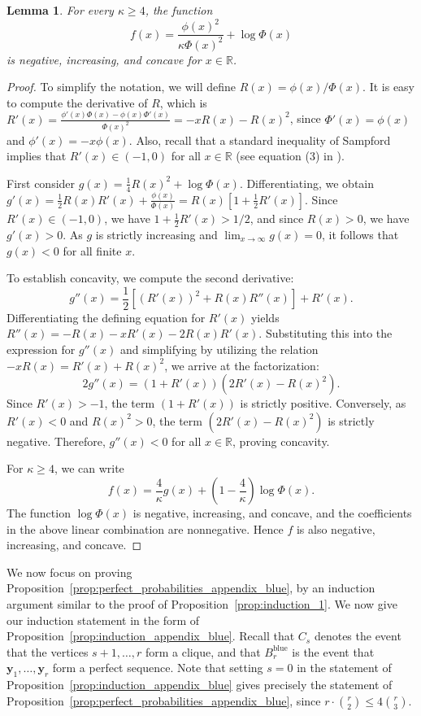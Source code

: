 \documentclass[11pt]{amsart}
\newtheorem{lemma}[theorem]{\bf Lemma}
\theoremstyle{definition}
\def\bR{\mathbb{R}}
\def\by{\boldsymbol{y}}
\DeclareMathOperator{\blue}{blue}
\begin{document}
\begin{lemma}\label{lemma:function_analysis}
For every $\kappa\geq 4$, the function
{\smaller[0.3]
\[
f(x)=\frac{\phi(x)^2}{\kappa\Phi(x)^2}+\log\Phi(x)
\]
}
is negative, increasing, and concave for $x\in \bR$.
\end{lemma}
\begin{proof}
To simplify the notation, we will define $R(x) = \phi(x)/\Phi(x)$. It is easy to compute the derivative of $R$, which is $R'(x) = \frac{\phi'(x)\Phi(x)-\phi(x)\Phi'(x)}{\Phi(x)^2}= -x R(x) - R(x)^2$, since $\Phi'(x)=\phi(x)$ and $\phi'(x)=-x\phi(x)$. Also, recall that a standard inequality of Sampford implies that $R'(x)\in (-1, 0)$ for all $x\in \bR$ (see equation (3) in \cite{Sampford}). 

First consider $g(x)=\frac{1}{4}R(x)^2+\log \Phi(x)$. Differentiating, we obtain $g'(x) = \frac{1}{2}R(x)R'(x) + \frac{\phi(x)}{\Phi(x)} = R(x)\left[1 + \frac{1}{2}R'(x)\right]$. Since $R'(x)\in (-1, 0)$, we have $1 + \frac{1}{2}R'(x) > 1/2$, and since $R(x) > 0$, we have $g'(x) > 0$. 
As $g$ is strictly increasing and $\lim_{x \to \infty} g(x) = 0$, it follows that $g(x) < 0$ for all finite $x$.

To establish concavity, we compute the second derivative:
{\smaller[0.3]
\[
g''(x) = \frac{1}{2} \left[ (R'(x))^2 + R(x)R''(x) \right] + R'(x).
\]
}
Differentiating the defining equation for $R'(x)$ yields $R''(x) = -R(x) - x R'(x) - 2R(x)R'(x)$. Substituting this into the expression for $g''(x)$ and simplifying by utilizing the relation $-x R(x) = R'(x) + R(x)^2$, we arrive at the factorization:
{\smaller[0.3]
\[
2g''(x) = (1 + R'(x))(2R'(x) - R(x)^2).
\]
}
Since $R'(x) > -1$, the term $(1+R'(x))$ is strictly positive. Conversely, as $R'(x) < 0$ and $R(x)^2 > 0$, the term $(2R'(x) - R(x)^2)$ is strictly negative. Therefore, $g''(x) < 0$ for all $x \in \mathbb{R}$, proving concavity.

For $\kappa\geq 4$, we can write
{\smaller[0.3]
\[
f(x)=\frac{4}{\kappa}g(x)+\left(1-\frac{4}{\kappa}\right)\log\Phi(x).
\]
}
The function $\log\Phi(x)$ is negative, increasing, and concave, and the coefficients in the above linear combination are nonnegative. Hence $f$ is also negative, increasing, and concave.
\end{proof}

We now focus on proving Proposition~\ref{prop:perfect_probabilities_appendix_blue}, by an induction argument similar to the proof of Proposition~\ref{prop:induction_1}. We now give our induction statement in the form of Proposition~\ref{prop:induction_appendix_blue}. Recall that $C_s$ denotes the event that the vertices $s+1, \dots, r$ form a clique, and that $B^{\blue}_r$ is the event that $\by_1, \dots, \by_r$ form a perfect sequence. Note that setting $s=0$ in the statement of Proposition~\ref{prop:induction_appendix_blue} gives precisely the statement of Proposition~\ref{prop:perfect_probabilities_appendix_blue}, since $r\cdot \binom{r}{2}\leq 4\binom{r}{3}$.
\end{document}
